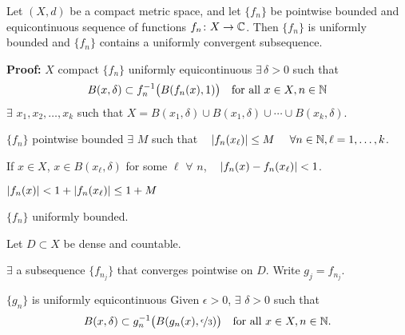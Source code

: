 \documentclass[10pt,aspectratio=169]{beamer}
\begin{document}
\begin{frame}
\begin{theorem}
Let $(X,d)$ be a compact metric space, and let $\{ f_n \}$
be pointwise bounded and equicontinuous sequence
of functions $f_n \colon X \to {\mathbb{C}}$.  Then
$\{f_n\}$ is uniformly bounded and $\{ f_n \}$ contains a uniformly
convergent subsequence.
\end{theorem}

\pause
\textbf{Proof:}
$X$ compact
\wthus
$\{ f_n \}$ uniformly equicontinuous
\pause
\wthus
$\exists \, \delta > 0$
such that
\begin{equation*}
B(x,\delta) \subset f_n^{-1}\bigl(B(f_n(x),1)\bigr) 
\quad
\text{for all }
x \in X, n \in {\mathbb{N}}
\end{equation*}
\pause
$\exists$ $x_1,x_2,\ldots,x_k$ such that
$
X = B(x_1,\delta) \cup B(x_1,\delta) \cup \cdots \cup B(x_k,\delta)$.

\pause
$\{ f_n \}$ pointwise bounded
\wthus
$\exists$ $M$
such that
~
$\lvert {f_n(x_\ell)} \rvert \leq M$ ~ $\forall n \in {\mathbb{N}}, \ell=1,\ldots,k$.

\pause
If
$x \in X$, $x \in B(x_\ell,\delta)$ for some $\ell$
\pause
\wthus
$\forall$ $n$,
~
$\lvert {f_n(x)-f_n(x_\ell)} \rvert < 1$.

\pause
\thus\quad
$\lvert {f_n(x)} \rvert < 1+ \lvert {f_n(x_\ell)} \rvert \leq 1+M$

\pause
\thus\quad
$\{f_n\}$ uniformly bounded.

\medskip
\pause

Let $D \subset X$ be dense and countable.
\pause

$\exists$ a subsequence $\{ f_{n_j} \}$ that converges pointwise on
$D$. \pause
Write $g_j = f_{n_j}$.

\pause
$\{ g_n \}$ is 
uniformly equicontinuous
\pause
\wthus 
Given $\epsilon > 0$, $\exists$ $\delta > 0$
such that
\begin{equation*}
B(x,\delta) \subset g_n^{-1}\bigl(B(g_n(x),\nicefrac{\epsilon}{3})\bigr)
\quad
\text{for all }
x \in X, n \in {\mathbb{N}} .
\end{equation*}
\end{frame}
\end{document}
